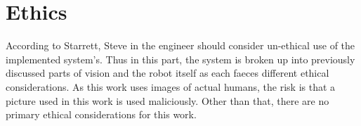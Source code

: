 \section{Ethics}


According to Starrett, Steve in \cite{starrettengineering} the engineer should consider un-ethical use of the implemented system's.
Thus in this part, the system is broken up into previously discussed parts of vision and the robot itself as each faeces different ethical considerations.
As this work uses images of actual humans, the risk is that a picture used in this work is used maliciously. 
Other than that, there are no primary ethical considerations for this work.